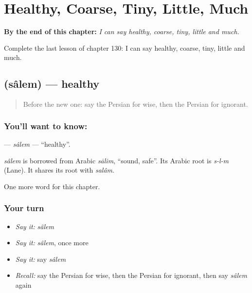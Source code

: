 
\chapter{Healthy, Coarse, Tiny, Little, Much}
\label{ch:fa-healthy-coarse-tiny-little-much}

\begin{chapteropening}
\textbf{By the end of this chapter:} \emph{I can say healthy, coarse, tiny, little and much.}

Complete the last lesson of chapter 130: I can say healthy, coarse, tiny, little and much.
\end{chapteropening}

\section[\texorpdfstring{\fa{سالم} (sâlem)}{سالم (sâlem)}]{ (sâlem) — healthy}

\label{lesson:FA-C130-salem}



\begin{quote}
Before the new one: say the Persian for wise, then the Persian for ignorant.
\end{quote}

\subsection*{You'll want to know: }
\textbf{} — \emph{sâlem} — \textquotedblleft{}healthy\textquotedblright{}.

\begin{cousinweb}
\emph{sâlem} is borrowed from Arabic \emph{sālim}, \textquotedblleft{}sound, safe\textquotedblright{}. Its Arabic root is \emph{s-l-m} (Lane). It shares its root with \emph{salâm}.
\end{cousinweb}

\begin{grammarlens}[title={What you've built}]
One more word for this chapter.
\end{grammarlens}

\subsection*{Your turn}
\begin{itemize}
\raggedright
  \item \emph{Say it:} \emph{sâlem}
  \item \emph{Say it:} \emph{sâlem}, once more
  \item \emph{Say it:} say \emph{sâlem}
  \item \emph{Recall:} say the Persian for wise, then the Persian for ignorant, then say \emph{sâlem} again
\end{itemize}


